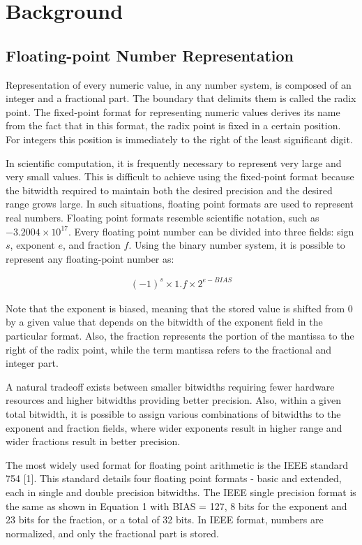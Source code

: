 \section{Background}
\label{sec:background}
\subsection{Floating-point Number Representation}
Representation of every numeric value, in any number system, is composed of an integer and a fractional part. The boundary that delimits them is called the radix point. The fixed-point format for representing numeric values derives its name from the fact that in this format, the radix point is fixed in a certain position. For integers this position is immediately to the right of the least significant digit.

In scientific computation, it is frequently necessary to represent very large and very small values. This is difficult to achieve using the fixed-point format because the bitwidth required to maintain both the desired precision and the desired range grows large. In such situations, floating point formats are used to represent real numbers. Floating point formats resemble scientific notation, such as $-3.2004\times10^{17}$. Every floating point number can be divided into three fields: sign $s$, exponent $e$, and fraction $f$. Using the binary number system, it is possible to represent any floating-point number as:

\begin{eqnarray} \label{eq:float}
(-1)^{s} \times 1.f \times 2^{e-BIAS}
\end{eqnarray}

Note that the exponent is biased, meaning that the stored value is shifted from 0 by a given value that depends on the bitwidth of the exponent field in the particular format. Also, the fraction represents the portion of the mantissa
to the right of the radix point, while the term mantissa refers to the fractional and integer part.

A natural tradeoff exists between smaller bitwidths requiring fewer hardware resources and higher bitwidths providing better precision. Also, within a given total bitwidth, it is possible to assign various combinations of bitwidths to the exponent and fraction fields, where wider exponents result in higher range and wider fractions result in better precision.

The most widely used format for floating point arithmetic is the IEEE standard 754 [1]. This standard details four floating point formats - basic and extended, each in single and double precision bitwidths. The IEEE single precision
format is the same as shown in Equation 1 with BIAS = 127, 8 bits for the exponent and 23 bits for the fraction, or a total of 32 bits. In IEEE format, numbers are normalized, and only the fractional part is stored.

